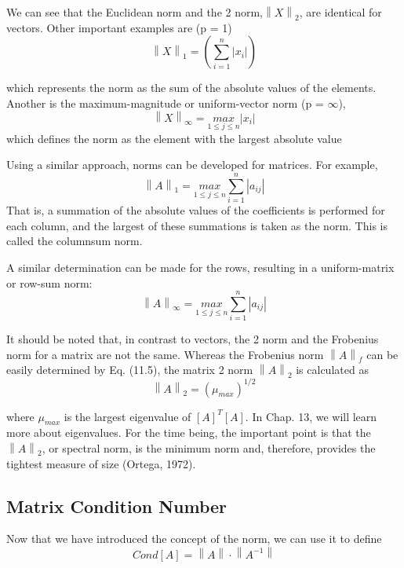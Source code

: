 \documentclass[../main.tex]{subfiles}
\begin{document}
We can see that the Euclidean norm and the 2 norm,$\left \| X \right \|_{2}$, are identical for vectors. Other important examples are (p = 1)
\begin{equation}
\left \| X \right \|_{1}=
\left ( \sum_{i=1}^{n}\left | x_{i} \right | \right )
\end{equation}

which represents the norm as the sum of the absolute values of the elements. Another is the maximum-magnitude or uniform-vector norm (p = $\infty$),
\begin{equation}
\left \| X \right \|_{\infty}=
\underset{1\leq j\leq n}{max}\left | x_{i} \right |
\end{equation}
which defines the norm as the element with the largest absolute value

Using a similar approach, norms can be developed for matrices. For example,
\begin{equation}
\left \| A \right \|_{1}=
\underset{1\leq j\leq n}{max}\sum_{i=1}^{n}\left | a_{ij} \right |
\end{equation}
That is, a summation of the absolute values of the coefficients is performed for each column, and the largest of these summations is taken as the norm. This is called the columnsum norm.

A similar determination can be made for the rows, resulting in a uniform-matrix or row-sum norm:
\begin{equation}
\left \| A \right \|_{\infty}=
\underset{1\leq j\leq n}{max}\sum_{i=1}^{n}\left | a_{ij} \right |
\end{equation}

It should be noted that, in contrast to vectors, the 2 norm and the Frobenius norm for a matrix are not the same. Whereas the Frobenius norm $\left \| A \right \|_{f}$ can be easily determined by Eq. (11.5), the matrix 2 norm $\left \| A \right \|_{2}$ is calculated as
\begin{equation}
\left \| A \right \|_{2}=(\mu_{max})^{1/2}
\end{equation}

where $\mu_{max}$ is the largest eigenvalue of $[A]^{T} [A]$. In Chap. 13, we will learn more about eigenvalues. For the time being, the important point is that the $\left \| A \right \|_{2}$, or spectral norm, is the minimum norm and, therefore, provides the tightest measure of size (Ortega, 1972).

\subsection{Matrix Condition Number}
Now that we have introduced the concept of the norm, we can use it to define
$$Cond[A] = \left \| A \right \| \cdot \left \| A^{-1} \right \|$$
\end{document}
